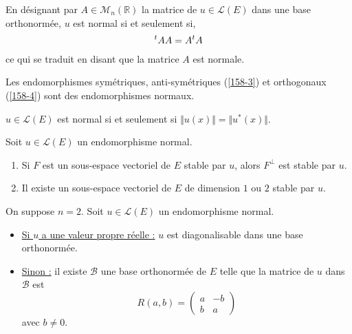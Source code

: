 	\begin{remark}
		En désignant par $A \in \mathcal{M}_n(\mathbb{R})$ la matrice de $u \in \mathcal{L}(E)$ dans une base orthonormée, $u$ est normal si et seulement si,
		\[ \mathstrut ^t A A = A \mathstrut ^t A \]
		ce qui se traduit en disant que la matrice $A$ est normale.
	\end{remark}

	\begin{example}
		Les endomorphismes symétriques, anti-symétriques (\cref{158-3}) et orthogonaux (\cref{158-4}) sont des endomorphismes normaux.
	\end{example}


	\begin{proposition}
		$u \in \mathcal{L}(E)$ est normal si et seulement si $\Vert u (x) \Vert = \Vert u^* (x) \Vert$.
	\end{proposition}


	\begin{proposition}
		Soit $u \in \mathcal{L}(E)$ un endomorphisme normal.
		\begin{enumerate}[label=(\roman*)]
			\item Si $F$ est un sous-espace vectoriel de $E$ stable par $u$, alors $F^\perp$ est stable par $u$.
			\item Il existe un sous-espace vectoriel de $E$ de dimension $1$ ou $2$ stable par $u$.
		\end{enumerate}
	\end{proposition}

	\begin{proposition}[Réduction dans le cas $n = 2$]
		\label{158-2}
		On suppose $n = 2$. Soit $u \in \mathcal{L}(E)$ un endomorphisme normal.
		\begin{itemize}
			\item \underline{Si $u$ a une valeur propre réelle :} $u$ est diagonalisable dans une base orthonormée.
			\item \underline{Sinon :} il existe $\mathcal{B}$ une base orthonormée de $E$ telle que la matrice de $u$ dans $\mathcal{B}$ est
			\[ R(a,b) = \begin{pmatrix} a & -b \\ b & a \end{pmatrix} \]
			avec $b \neq 0$.
		\end{itemize}
	\end{proposition}

